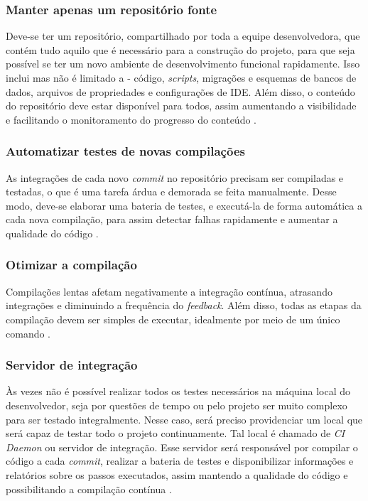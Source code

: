 \subsubsection{Manter apenas um repositório fonte}
Deve-se ter um repositório, compartilhado por toda a equipe desenvolvedora, que contém tudo aquilo que é necessário para a construção do projeto, para que seja possível se ter um novo ambiente de desenvolvimento funcional rapidamente. Isso inclui mas não é limitado a - código, \emph{scripts}, migrações e esquemas de bancos de dados, arquivos de propriedades e configurações de IDE. Além disso, o conteúdo do repositório deve estar disponível para todos, assim aumentando a visibilidade e facilitando o monitoramento do progresso do conteúdo \cite{gitlab-ci-cd,martin-fowler-continuous-integration}.

\subsubsection{Automatizar testes de novas compilações}
As integrações de cada novo \emph{commit} no repositório precisam ser compiladas e testadas, o que é uma tarefa árdua e demorada se feita manualmente. Desse modo, deve-se elaborar uma bateria de testes, e executá-la de forma automática a cada nova compilação, para assim detectar falhas rapidamente e aumentar a qualidade do código \cite{gitlab-ci-cd,martin-fowler-continuous-integration}.

\subsubsection{Otimizar a compilação}
Compilações lentas afetam negativamente a integração contínua, atrasando integrações e diminuindo a frequência do \emph{feedback}. Além disso, todas as etapas da compilação devem ser simples de executar, idealmente por meio de um único comando \cite{martin-fowler-continuous-integration}.

\subsubsection{Servidor de integração}
Às vezes não é possível realizar todos os testes necessários na máquina local do desenvolvedor, seja por questões de tempo ou pelo projeto ser muito complexo para ser testado integralmente. Nesse caso, será preciso providenciar um local que será capaz de testar todo o projeto continuamente. Tal local é chamado de \emph{CI Daemon} ou servidor de integração. Esse servidor será responsável por compilar o código a cada \emph{commit}, realizar a bateria de testes e disponibilizar informações e relatórios sobre os passos executados, assim mantendo a qualidade do código e possibilitando a compilação contínua \cite{martin-fowler-continuous-integration}.

